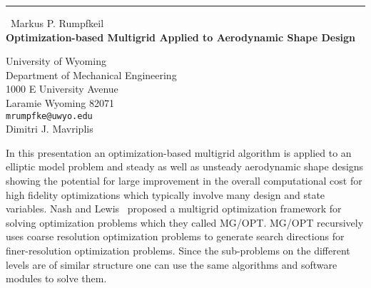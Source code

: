 \documentclass{report}
\begin{document}
\begin{center}
\rule{6in}{1pt} \
{\large Markus P. Rumpfkeil \\
{\bf Optimization-based Multigrid Applied to Aerodynamic Shape Design}}

University of Wyoming \\ Department of Mechanical Engineering \\ 1000 E University Avenue \\ Laramie Wyoming 82071
\\
{\tt mrumpfke@uwyo.edu}\\
Dimitri J. Mavriplis\end{center}

In this presentation an optimization-based multigrid algorithm is applied
to an elliptic model problem and steady as well as unsteady aerodynamic
shape designs showing
the potential for large improvement in the overall computational cost for
high fidelity optimizations which typically involve many design
and state variables. Nash and Lewis~\cite{Lewis2005} proposed a multigrid
optimization framework for solving optimization problems which they
called MG/OPT.
MG/OPT recursively uses coarse resolution optimization problems to
generate search directions for finer-resolution optimization problems.
Since the sub-problems on the different levels are of similar structure
one can use the same algorithms and software modules to solve them.
\end{document}
